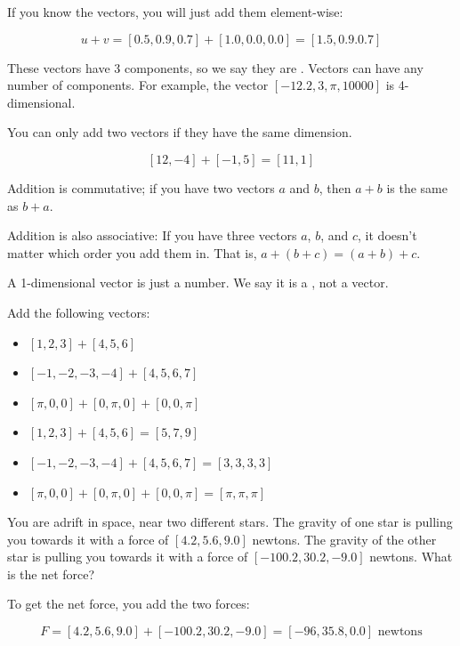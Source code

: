 If you know the vectors, you will just add them element-wise:

$$ u + v = [0.5, 0.9, 0.7] + [1.0, 0.0, 0.0] = [1.5, 0.9. 0.7] $$

These vectors have 3 components, so we say they are . 
Vectors can have any number of components. For example, the vector
 $[-12.2, 3, \pi, 10000]$ is 4-dimensional.

 You can only add two vectors if they have the same dimension.

 $$ [12, -4] + [-1, 5] = [11,1] $$

 Addition is commutative; if you have two vectors $a$ and $b$, then
 $a + b$ is the same as $b + a$.

 Addition is also associative: If you have three vectors $a$, $b$, and $c$,
 it doesn't matter which order you add them in. 
 That is, $a + (b + c) = (a + b) + c$.

 A 1-dimensional vector is just a number. We say it is a 
 , not a vector.

 \begin{Exercise}[title={Adding vectors}, label=adding_vectors]
Add the following vectors:
\begin{itemize}
    \item $[1, 2, 3] + [4, 5, 6]$
    \item $[-1, -2, -3, -4] + [4, 5, 6, 7]$
    \item $[\pi, 0, 0] + [0, \pi, 0] + [0, 0, \pi]$
\end{itemize}
\end{Exercise}
\begin{Answer}[ref=adding_vectors]
    \begin{itemize}
        \item $[1, 2, 3] + [4, 5, 6] = [5, 7, 9]$
        \item $[-1, -2, -3, -4] + [4, 5, 6, 7] = [3, 3, 3, 3]$
        \item $[\pi, 0, 0] + [0, \pi, 0] + [0, 0, \pi] = [\pi, \pi, \pi]$ 
    \end{itemize}
\end{Answer}

    \begin{Exercise}[title={Adding Forces}, label=adding_forces]
        You are adrift in space, near two different stars. 
        The gravity of one star is pulling you towards it with a 
        force of $[4.2, 5.6, 9.0]$ newtons.
        The gravity of the other star is pulling you towards it with
        a force of $[-100.2, 30.2, -9.0]$ newtons. What is the net force?
        \end{Exercise}
        \begin{Answer}[ref=adding_forces]
            To get the net force, you add the two forces:

            $$F = [4.2, 5.6, 9.0] + [-100.2, 30.2, -9.0] = [-96, 35.8, 0.0] \text{ newtons}$$
   
\end{Answer}

